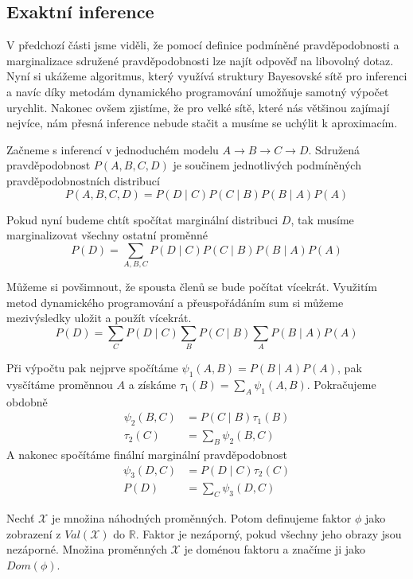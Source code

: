 \subsection{Exaktní inference}

V předchozí části jsme viděli, že pomocí definice podmíněné pravděpodobnosti a marginalizace sdružené pravděpodobnosti lze najít odpověď na libovolný dotaz. 
Nyní si ukážeme algoritmus, který využívá struktury Bayesovské sítě pro inferenci a navíc díky metodám dynamického programování umožňuje samotný výpočet urychlit.
Nakonec ovšem zjistíme, že pro velké sítě, které nás většinou zajímají nejvíce, nám přesná inference nebude stačit a musíme se uchýlit k aproximacím.

Začneme s inferencí v jednoduchém modelu $A \rightarrow B \rightarrow C \rightarrow D$.
Sdružená pravděpodobnost $P(A, B, C, D)$ je součinem jednotlivých podmíněných pravděpodobnostních distribucí
\begin{equation}
P(A, B, C, D) = P(D \mid C) P(C \mid B) P(B \mid A) P(A)
\end{equation}

Pokud nyní budeme chtít spočítat marginální distribuci $D$, tak musíme marginalizovat všechny ostatní proměnné
\begin{equation}
P(D) = \sum_{A, B, C} P(D \mid C) P(C \mid B) P(B \mid A) P(A)
\end{equation}

Můžeme si povšimnout, že spousta členů se bude počítat vícekrát.
Využitím metod dynamického programování a přeuspořádáním sum si můžeme mezivýsledky uložit a použít vícekrát.
\begin{equation}
P(D) = \sum_C P(D \mid C) \sum_B P(C \mid B) \sum_A P(B \mid A) P(A)
\end{equation}

Při výpočtu pak nejprve spočítáme $\psi_1(A, B) =  P(B \mid A) P(A)$,  pak vysčítáme proměnnou $A$ a získáme $\tau_1(B) = \sum_A \psi_1(A, B)$.
Pokračujeme obdobně
\begin{align}
    \psi_2(B, C) &= P(C \mid B) \tau_1(B) \\
    \tau_2(C) &= \sum_B \psi_2(B, C)
\end{align}
A nakonec spočítáme finální marginální pravděpodobnost
\begin{align}
    \psi_3(D, C) &= P(D \mid C) \tau_2(C) \\
    P(D) &= \sum_C \psi_3(D, C)
\end{align}

Nechť $\mathcal{X}$ je množina náhodných proměnných. 
Potom definujeme faktor $\phi$ jako zobrazení z $Val(\mathcal{X})$ do $\mathbb{R}$. Faktor je nezáporný, pokud všechny jeho obrazy jsou nezáporné. Množina proměnných $\mathcal{X}$ je doménou faktoru a značíme ji jako $Dom(\phi)$.

